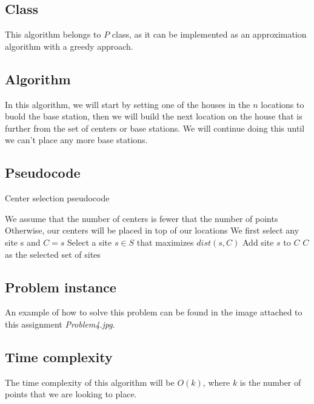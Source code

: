 \documentclass{article}
\begin{document}
\subsection*{Class}

This algorithm belongs to $P$ class, as it can be implemented as an approximation algorithm with a greedy approach.

\subsection*{Algorithm}

In this algorithm, we will start by setting one of the houses in the $n$ locations to buold the base station, then we will build the next location on the house that is further from the set of centers or base stations. We will continue doing this until we can't place any more base stations.

\subsection*{Pseudocode}

\begin{algorithm}[H]
\caption{Center selection pseudocode}
\begin{algorithmic}[1]
\State We assume that the number of centers is fewer that the number of points
\State Otherwise, our centers will be placed in top of our locations
\State We first select any site s and $C = {s}$
 \State Select a site $s\in S$ that maximizes $dist(s,C)$
 \State Add site $s$ to $C$
\EndWhile
\State \Return $C$ as the selected set of sites
\end{algorithmic}
\end{algorithm}

\subsection*{Problem instance}

An example of how to solve this problem can be found in the image attached to this assignment \textit{Problem4.jpg}.

\subsection*{Time complexity}

The time complexity of this algorithm will be $O(k)$, where $k$ is the number of points that we are looking to place.
\end{document}
